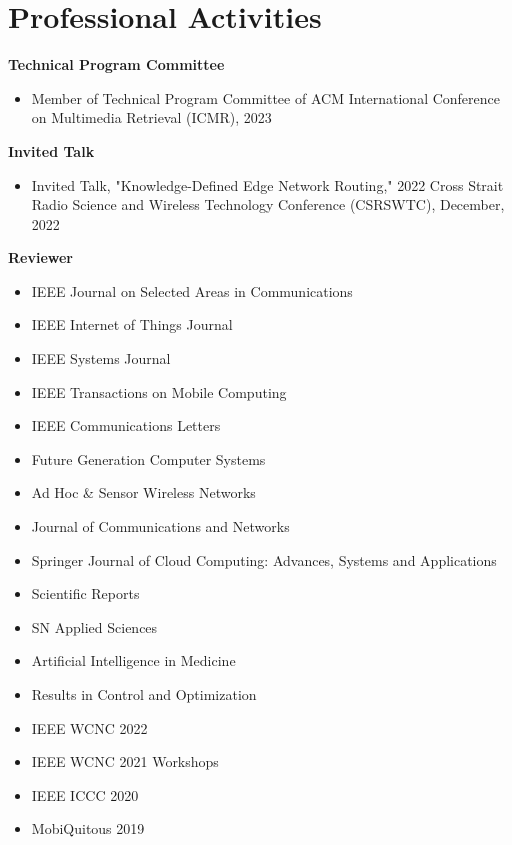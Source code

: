 \documentclass[letterpaper,11pt]{article}
\newcommand{\contentlength}{5.25in} %
\begin{document}
	\section{\textbf{Professional Activities}}
	\begin{tcolorbox}[flush right,breakable,colback=white,colframe=white,width=\contentlength]
		\textbf{Technical Program Committee}
		\begin{itemize}
			\item Member of Technical Program Committee of ACM International Conference on Multimedia Retrieval (ICMR), 2023
		\end{itemize}
		
		\textbf{Invited Talk}
		\begin{itemize}
			\item Invited Talk, "Knowledge-Defined Edge Network Routing," 2022 Cross Strait Radio Science and Wireless Technology Conference (CSRSWTC), December, 2022
		\end{itemize}
	
		\textbf{Reviewer}
		\begin{itemize}[itemsep=0mm]
			\item IEEE Journal on Selected Areas in Communications
			\item IEEE Internet of Things Journal
			\item IEEE Systems Journal
			\item IEEE Transactions on Mobile Computing
			\item IEEE Communications Letters
			\item Future Generation Computer Systems
			\item Ad Hoc \& Sensor Wireless Networks
			\item Journal of Communications and Networks
			\item Springer Journal of Cloud Computing: Advances, Systems and Applications
			\item Scientific Reports
			\item SN Applied Sciences
			\item Artificial Intelligence in Medicine
			\item Results in Control and Optimization
			\item IEEE WCNC 2022
			\item IEEE WCNC 2021 Workshops
			\item IEEE ICCC 2020
			\item MobiQuitous 2019
		\end{itemize}
	\end{tcolorbox}
	
\end{document}

